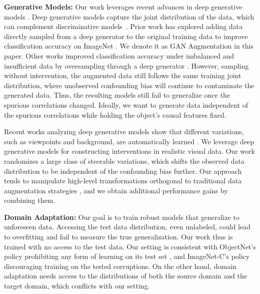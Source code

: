 \documentclass[final]{cvpr}
\begin{document}
\textbf{Generative Models:} 
Our work leverages recent advances in deep generative models \cite{goodfellow2014generative, kingma2013autoencoding, Jaakkola, BigGAN, razavi2019vqvae}. Deep generative models capture the joint distribution of the data, which can complement discriminative models~\cite{Jaakkola, radford2015unsupervised}. Prior work has explored adding data directly sampled from a deep generator to the original training data to improve classification accuracy on ImageNet \cite{CAS}. We denote it as GAN Augmentation in this paper.
Other works improved classification accuracy under imbalanced and insufficient data by oversampling through a deep generator \cite{GANaug, GanLiver, lowshotgan, antoniou2017gandataaug}. However, sampling without intervention, the augmented data still follows the same training joint distribution, where unobserved confounding bias will continue to contaminate the generated data. Thus, the resulting models still fail to generalize once the spurious correlations changed. Ideally, we want to generate data independent of the spurious correlations while holding the object's causal features fixed.




Recent works analyzing deep generative models show that different variations, such as viewpoints and background, are automatically learned \cite{jahanian2019steerability, hrknen2020ganspace}. We leverage deep generative models for constructing interventions in realistic visual data. Our work randomizes a large class of steerable variations, which shifts the observed data distribution to be independent of the confounding bias further. 
Our approach tends to manipulate high-level transformations orthogonal to traditional data augmentation strategies \cite{augsurvey, tian2020rethinking, AlexNet}, and we obtain additional performance gains by combining them.




\textbf{Domain Adaptation:} Our goal is to train robust models that generalize to unforeseen data. Accessing the test data distribution, even unlabeled, could lead to overfitting and fail to measure the true generalization. Our work thus is trained with no access to the test data. Our setting is consistent with ObjectNet's policy prohibiting any form of learning on its test set \cite{Objectnet}, and ImageNet-C's policy discouraging training on the tested corruptions. On the other hand, domain adaptation \cite{Hoffman_cycada2017, aligndomain_2018_CVPR, wang2020continuously} needs access to the distributions of both the source domain and the target domain, which conflicts with our setting.
\end{document}
